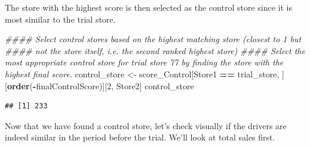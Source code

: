 \documentclass[
]{article}
\newenvironment{Shaded}{\begin{snugshade}}{\end{snugshade}}
\newcommand{\CommentTok}[1]{\textcolor[rgb]{0.56,0.35,0.01}{\textit{#1}}}
\newcommand{\DecValTok}[1]{\textcolor[rgb]{0.00,0.00,0.81}{#1}}
\newcommand{\KeywordTok}[1]{\textcolor[rgb]{0.13,0.29,0.53}{\textbf{#1}}}
\newcommand{\NormalTok}[1]{#1}
\newcommand{\OperatorTok}[1]{\textcolor[rgb]{0.81,0.36,0.00}{\textbf{#1}}}
\newcommand{\StringTok}[1]{\textcolor[rgb]{0.31,0.60,0.02}{#1}}
\begin{document}
The store with the highest score is then selected as the control store
since it is most similar to the trial store.

\begin{Shaded}
\begin{Highlighting}[]
\CommentTok{#### Select control stores based on the highest matching store (closest to 1 but}
\CommentTok{#### not the store itself, i.e. the second ranked highest store)}
\CommentTok{#### Select the most appropriate control store for trial store 77 by finding the store with the highest final score.}
\NormalTok{control_store <-}\StringTok{ }\NormalTok{score_Control[Store1 }\OperatorTok{==}\StringTok{ }\NormalTok{trial_store, ][}\KeywordTok{order}\NormalTok{(}\OperatorTok{-}\NormalTok{finalControlScore)][}\DecValTok{2}\NormalTok{, Store2]}
\NormalTok{control_store}
\end{Highlighting}
\end{Shaded}

\begin{verbatim}
## [1] 233
\end{verbatim}

Now that we have found a control store, let's check visually if the
drivers are indeed similar in the period before the trial. We'll look at
total sales first.
\end{document}
